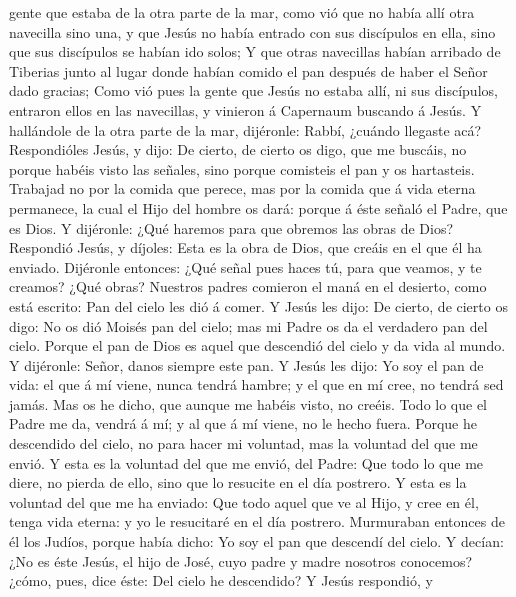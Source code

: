 gente que estaba de la otra parte de la mar, como vió que no había allí
otra navecilla sino una, y que Jesús no había entrado con sus discípulos
en ella, sino que sus discípulos se habían ido solos;  Y
que otras navecillas habían arribado de Tiberias junto al lugar donde
habían comido el pan después de haber el Señor dado gracias;
 Como vió pues la gente que Jesús no estaba allí, ni sus
discípulos, entraron ellos en las navecillas, y vinieron á Capernaum
buscando á Jesús.  Y hallándole de la otra parte de la mar,
dijéronle: Rabbí, ¿cuándo llegaste acá?  Respondióles
Jesús, y dijo: De cierto, de cierto os digo, que me buscáis, no porque
habéis visto las señales, sino porque comisteis el pan y os hartasteis.
 Trabajad no por la comida que perece, mas por la comida
que á vida eterna permanece, la cual el Hijo del hombre os dará: porque
á éste señaló el Padre, que es Dios.  Y dijéronle: ¿Qué
haremos para que obremos las obras de Dios?  Respondió
Jesús, y díjoles: Esta es la obra de Dios, que creáis en el que él ha
enviado.  Dijéronle entonces: ¿Qué señal pues haces tú,
para que veamos, y te creamos? ¿Qué obras?  Nuestros padres
comieron el maná en el desierto, como está escrito: Pan del cielo les
dió á comer.  Y Jesús les dijo: De cierto, de cierto os
digo: No os dió Moisés pan del cielo; mas mi Padre os da el verdadero
pan del cielo.  Porque el pan de Dios es aquel que
descendió del cielo y da vida al mundo.  Y dijéronle:
Señor, danos siempre este pan.  Y Jesús les dijo: Yo soy el
pan de vida: el que á mí viene, nunca tendrá hambre; y el que en mí
cree, no tendrá sed jamás.  Mas os he dicho, que aunque me
habéis visto, no creéis.  Todo lo que el Padre me da,
vendrá á mí; y al que á mí viene, no le hecho fuera. 
Porque he descendido del cielo, no para hacer mi voluntad, mas la
voluntad del que me envió.  Y esta es la voluntad del que
me envió, del Padre: Que todo lo que me diere, no pierda de ello, sino
que lo resucite en el día postrero.  Y esta es la voluntad
del que me ha enviado: Que todo aquel que ve al Hijo, y cree en él,
tenga vida eterna: y yo le resucitaré en el día postrero. 
Murmuraban entonces de él los Judíos, porque había dicho: Yo soy el pan
que descendí del cielo.  Y decían: ¿No es éste Jesús, el
hijo de José, cuyo padre y madre nosotros conocemos? ¿cómo, pues, dice
éste: Del cielo he descendido?  Y Jesús respondió, y
